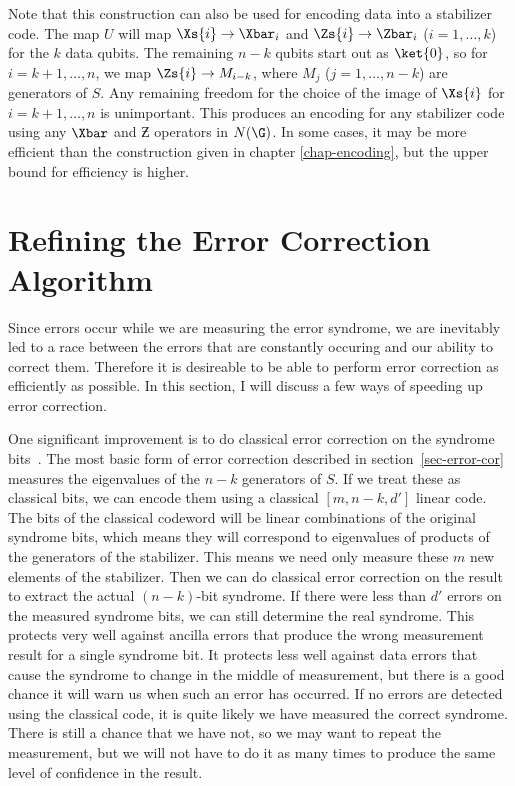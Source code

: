 Note that this construction can also be used for encoding data into a
stabilizer code.  The map $U$ will map $\Xs{i} \rightarrow \Xbar_i$ and
$\Zs{i} \rightarrow \Zbar_i$ ($i = 1, \ldots, k$) for the $k$ data qubits.  The
remaining $n-k$ qubits start out as $\ket{0}$, so for $i=k+1, \ldots, n$, we
map $\Zs{i} \rightarrow M_{i-k}$, where $M_j$ ($j = 1, \ldots, n-k$) are
generators of $S$.  Any remaining freedom for the choice of the image of
$\Xs{i}$ for $i = k+1, \ldots, n$ is unimportant.  This produces an encoding
for any stabilizer code using any $\Xbar$ and $\Zbar$ operators in
$N(\G)$.  In some cases, it may be more efficient than the construction
given in chapter \ref{chap-encoding}, but the upper bound for efficiency is
higher.

\section{Refining the Error Correction Algorithm}

Since errors occur while we are measuring the error syndrome, we are
inevitably led to a race between the errors that are constantly occuring
and our ability to correct them.  Therefore it is desireable to be able to
perform error correction as efficiently as possible.  In this section, I will
discuss a few ways of speeding up error correction.

One significant improvement is to do classical error correction on the
syndrome bits~\cite{evslin}.  The most basic form of error correction
described in section~\ref{sec-error-cor} measures the eigenvalues of the
$n-k$ generators of $S$.  If we treat these as classical bits, we can encode
them using a classical $[m, n-k, d']$ linear code.  The bits of the classical
codeword will be linear combinations of the original syndrome bits, which
means they will correspond to eigenvalues of products of the generators of
the stabilizer.  This means we need only measure these $m$ new elements
of the stabilizer.  Then we can do classical error correction on the result to
extract the actual $(n-k)$-bit syndrome.  If there were less than $d'$
errors on the measured syndrome bits, we can still determine the real
syndrome.  This protects very well against ancilla errors that produce the
wrong measurement result for a single syndrome bit.  It protects less well
against data errors that cause the syndrome to change in the middle of
measurement, but there is a good chance it will warn us when such an
error has occurred.  If no errors are detected using the classical code, it is
quite likely we have measured the correct syndrome.  There is still a
chance that we have not, so we may want to repeat the measurement, but
we will not have to do it as many times to produce the same level of
confidence in the result.

